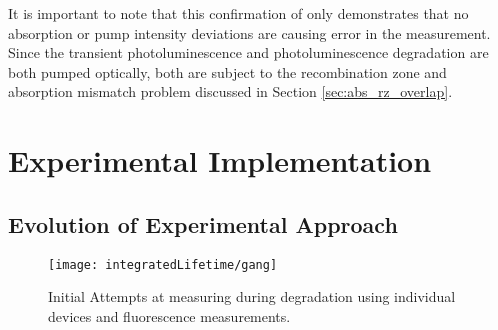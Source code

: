 \documentclass[../thesis.tex]{subfiles}
\begin{document}
It is important to note that this confirmation of \pl only demonstrates that no absorption or pump intensity deviations are causing error in the measurement.
Since the transient photoluminescence and photoluminescence degradation are both pumped optically, both are subject to the recombination zone and absorption mismatch problem discussed in Section \ref{sec:abs_rz_overlap}.

\newpage

\section{Experimental Implementation}

\subsection{Evolution of Experimental Approach}

\begin{wrapfigure}{r}{.5\textwidth}
\centering
\texttt{[image: integratedLifetime/gang]}
\caption{Initial Attempts at measuring \pl during degradation using individual devices and fluorescence measurements.}
\label{fig:gang}
\end{wrapfigure}
\end{document}

